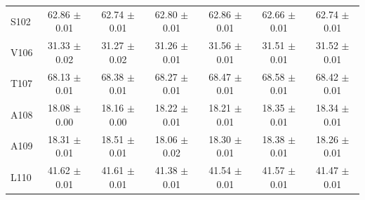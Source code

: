 \documentclass[%
 aip,
 amsmath,amssymb,
 preprint,%
]{revtex4-1}
\begin{document}
\begin{center}
\begin{longtable}{l|c|c|c|c|c|c}
S102 & 62.86 $\pm$ 0.01 & 62.74 $\pm$ 0.01 & 62.80 $\pm$ 0.01 & 62.86 $\pm$ 0.01 & 62.66 $\pm$ 0.01 & 62.74 $\pm$ 0.01 \\
V106 & 31.33 $\pm$ 0.02 & 31.27 $\pm$ 0.02 & 31.26 $\pm$ 0.01 & 31.56 $\pm$ 0.01 & 31.51 $\pm$ 0.01 & 31.52 $\pm$ 0.01 \\
T107 & 68.13 $\pm$ 0.01 & 68.38 $\pm$ 0.01 & 68.27 $\pm$ 0.01 & 68.47 $\pm$ 0.01 & 68.58 $\pm$ 0.01 & 68.42 $\pm$ 0.01 \\
A108 & 18.08 $\pm$ 0.00 & 18.16 $\pm$ 0.00 & 18.22 $\pm$ 0.01 & 18.21 $\pm$ 0.01 & 18.35 $\pm$ 0.01 & 18.34 $\pm$ 0.01 \\
A109 & 18.31 $\pm$ 0.01 & 18.51 $\pm$ 0.01 & 18.06 $\pm$ 0.02 & 18.30 $\pm$ 0.01 & 18.38 $\pm$ 0.01 & 18.26 $\pm$ 0.01 \\
L110 & 41.62 $\pm$ 0.01 & 41.61 $\pm$ 0.01 & 41.38 $\pm$ 0.01 & 41.54 $\pm$ 0.01 & 41.57 $\pm$ 0.01 & 41.47 $\pm$ 0.01 \\
\end{longtable}
\end{center}
\endgroup
\end{document}
